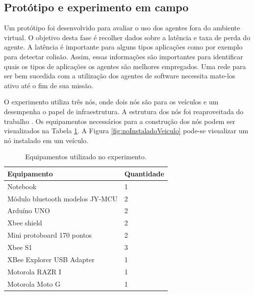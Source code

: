 \subsection{Protótipo e experimento em campo}
\label{subsec:prototipoExperimento}

Um protótipo foi desenvolvido para avaliar o uso dos agentes fora do ambiente virtual. O objetivo desta fase é recolher dados sobre a latência e taxa de perda do agente. A latência é importante para alguns tipos aplicações como por exemplo para detectar colisão. Assim, essas informações são importantes para identificar quais os tipos de aplicações os agentes são melhores empregados. Uma rede para ser bem sucedida com a utilização dos agentes de software necessita mate-los ativo até o fim de sua missão.

O experimento utiliza três nós, onde dois nós são para os veículos e um desempenha o papel de infraestrutura. A estrutura dos nós foi reaproveitada do trabalho \cite{santanaMestrado:2014}. Os equipamentos necessários para a construção dos nós podem ser visualizados na Tabela \ref{tab:componentesPrototipo}. A Figura \ref{fig:noInstaladoVeiculo} pode-se visualizar um nó instalado em um veículo.

\begin{table}[ht]
	\caption{Equipamentos utilizado no experimento.}
	\centering
	\begin{tabular}{|l|l|}
		\hline
		Equipamento & Quantidade \\ \hline
		Notebook & 1 \\ \hline 
		Módulo bluetooth modelos JY-MCU & 2 \\ \hline
		Arduíno UNO & 2 \\ \hline
		Xbee shield & 2 \\ \hline
		Mini protoboard 170 pontos & 2 \\ \hline
		Xbee S1 & 3 \\ \hline
		XBee Explorer USB Adapter & 1 \\ \hline 
		Motorola RAZR I & 1 \\ \hline
		Motorola Moto G & 1 \\ \hline
	\end{tabular}
	\label{tab:componentesPrototipo}
\end{table}

